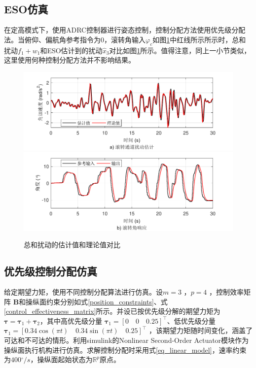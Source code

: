 \subsection{ESO仿真}
在定高模式下，使用ADRC控制器进行姿态控制，控制分配方法使用优先级分配法。当俯仰、偏航角参考指令为0，滚转角输入$ \varphi_c $如图\ref{ESO_m_r}中红线所示所示时，总和扰动$ f_1+w_1 $和ESO估计到的扰动$ \hat{x}_3 $对比如图\ref{ESO_m_r}所示。值得注意，同上一小节类似，这里使用何种控制分配方法并不影响结果。
\begin{figure}[htbp]
	\centering	
	\includegraphics[scale=1]{Fig/ESOa.pdf}
	\includegraphics[scale=1]{Fig/ESOb.pdf}
	\caption{\label{ESO_m_r}总和扰动的估计值和理论值对比}
\end{figure}
\subsection{优先级控制分配仿真}
给定期望力矩，使用不同控制分配算法进行仿真。设$ m=3 $ ，$ p=4 $ ，控制效率矩阵 $ \bm{B} $和操纵面约束分别如式\eqref{position_constraints}、式\eqref{control_effectiveness_matrix}所示。并设已按优先级分解的期望力矩为 $\bm{\tau}=\bm{\tau}_1+\bm{\tau}_2$，其中高优先级分量 $\bm{\tau}_1 = [0 \quad 0 \quad 0.25]^\top $、低优先级分量$\bm{\tau}_1 = [0.34\cos(\pi t) \quad 0.34\sin (\pi t) \quad 0.25]^\top $ ，该期望力矩随时间变化，涵盖了可达和不可达的情形。利用simulink的Nonlinear Second-Order Actuator模块作为操纵面执行机构进行仿真。求解控制分配时采用式\eqref{eq_linear_model}，速率约束为$400{{}^\circ }/{s}$，操纵面起始状态为$\mathbb{R}^p$原点。

